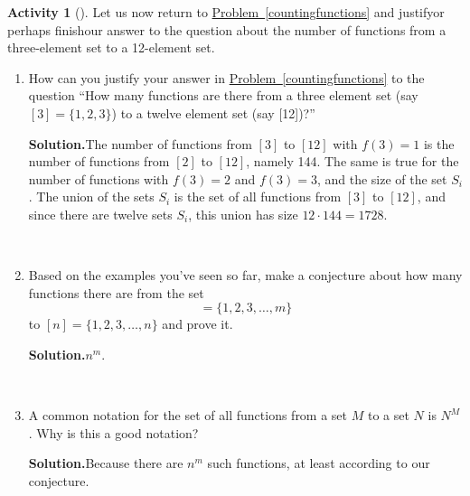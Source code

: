 \documentclass[10pt,]{book}
\theoremstyle{plain}
\theoremstyle{definition}
\newtheorem{activity}[project]{Activity}
\numberwithin{equation}{chapter}
\begin{document}
\begin{activity}[]\label{countingfunctions2}
Let us now return to \hyperref[countingfunctions]{Problem~\ref{countingfunctions}} and justify\textemdash{}or perhaps finish\textemdash{}our answer to the question about the number of functions from a three-element set to a 12-element set.%
~\par
\begin{enumerate}[label=(\alph*)]
 \item How can you justify your answer in \hyperref[countingfunctions]{Problem~\ref{countingfunctions}} to the question ``How many functions are there from a three element set (say \([3]=\{1,2,3\}\)) to a twelve element set (say [12])?''%
\par\medskip\noindent%
\textbf{Solution.}\quad The number of functions from \([3]\) to \([12]\) with \(f(3) =1\) is the number of functions from \([2]\) to \([12]\), namely 144. The same is true for the number of functions with \(f(3)=2\) and \(f(3)=3\), and the size of the set \(S_i\). The union of the sets \(S_i\) is the set of all functions from \([3]\) to \([12]\), and since there are twelve sets \(S_i\), this union has size \(12\cdot144= 1728\).%

~\par
\item Based on the examples you've seen so far, make a conjecture about how many functions there are from the set%
\begin{equation*}
[m] = \{1,2,3,\dots,m\}
\end{equation*}
to \([n]=\{1,2,3,\dots,n\}\) and prove it.%
\par\medskip\noindent%
\textbf{Solution.}\quad \(n^m\).%

~\par
\item A common notation for the set of all functions from a set \(M\) to a set \(N\) is \(N^M\).  Why is this a good notation?%
\par\medskip\noindent%
\textbf{Solution.}\quad Because there are \(n^m\) such functions, at least according to our conjecture.%

\end{enumerate}
\end{activity}
\end{document}
